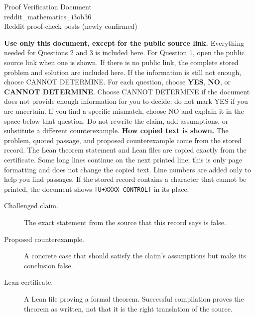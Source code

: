 \documentclass[11pt]{article}
\begin{document}
\begin{center}{\LARGE Proof Verification Document}\\[2pt]{\large reddit\_mathematics\_i3ob36}\\[2pt]{\small Reddit proof-check posts (newly confirmed)}\end{center}
\begin{center}\end{center}
\textbf{Use only this document, except for the public source link.} Everything needed for Questions 2 and 3 is included here. For Question 1, open the public source link when one is shown. If there is no public link, the complete stored problem and solution are included here. If the information is still not enough, choose CANNOT DETERMINE.
For each question, choose \textbf{YES}, \textbf{NO}, or \textbf{CANNOT DETERMINE}. Choose CANNOT DETERMINE if the document does not provide enough information for you to decide; do not mark YES if you are uncertain. If you find a specific mismatch, choose NO and explain it in the space below that question. Do not rewrite the claim, add assumptions, or substitute a different counterexample.
\textbf{How copied text is shown.} The problem, quoted passage, and proposed counterexample come from the stored record. The Lean theorem statement and Lean files are copied exactly from the certificate. Some long lines continue on the next printed line; this is only page formatting and does not change the copied text. Line numbers are added only to help you find passages. If the stored record contains a character that cannot be printed, the document shows \texttt{[U+XXXX CONTROL]} in its place.
\begin{description}
\item[Challenged claim.] The exact statement from the source that this record says is false.
\item[Proposed counterexample.] A concrete case that should satisfy the claim's assumptions but make its conclusion false.
\item[Lean certificate.] A Lean file proving a formal theorem. Successful compilation proves the theorem as written, not that it is the right translation of the source.
\end{description}
\end{document}
